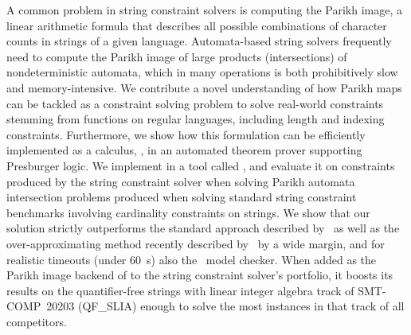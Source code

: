 A common problem in string constraint solvers is computing the Parikh image, a
linear arithmetic formula that describes all possible combinations of character
counts in strings of a given language. Automata-based string solvers frequently
need to compute the Parikh image of large products (intersections) of
nondeterministic automata, which in many operations is both prohibitively slow
and memory-intensive. We contribute a novel understanding of how Parikh maps can
be tackled as a constraint solving problem to solve real-world constraints
stemming from functions on regular languages, including length and indexing
constraints. Furthermore, we show how this formulation can be efficiently
implemented as a calculus, \Calculus{}, in an automated theorem prover
supporting Presburger logic.  We implement \Calculus{} in a tool called
\Catra{}, and evaluate it on constraints produced by the \OstrichPlus{} string
constraint solver when solving Parikh automata intersection problems produced
when solving standard string constraint benchmarks involving cardinality
constraints on strings. We show that our solution strictly outperforms the
standard approach described by~\citeauthor{generate-parikh-image} as well as the
over-approximating method recently described by~\citeauthor{approximate-parikh}
by a wide margin, and for realistic timeouts (under \SI{60}{s}) also
the~\Nuxmv{} model checker. When added as the Parikh image backend of \OstrichPlus{} to
the \Ostrich{} string constraint solver's portfolio, it boosts its results on the
quantifier-free strings with linear integer algebra track of SMT-COMP~20203 (QF\_SLIA)
enough to solve the most \Unsat{} instances in that track of all competitors.